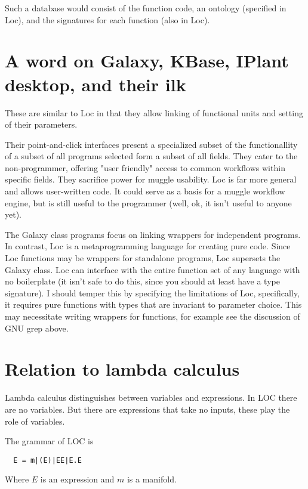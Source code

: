 \documentclass[12pt]{article}
\begin{document}
Such a database would consist of the function code, an ontology (specified in
Loc), and the signatures for each function (also in Loc).

\section{A word on Galaxy, KBase, IPlant desktop, and their ilk}

These are similar to Loc in that they allow linking of functional units and
setting of their parameters.

Their point-and-click interfaces present a specialized subset of the
functionallity of a subset of all programs selected form a subset of all
fields. They cater to the non-programmer, offering "user friendly" access to
common workflows within specific fields. They sacrifice power for muggle
usability. Loc is far more general and allows user-written code. It could serve
as a basis for a muggle workflow engine, but is still useful to the programmer
(well, ok, it isn't useful to anyone yet).

The Galaxy class programs focus on linking wrappers for independent programs.
In contrast, Loc is a metaprogramming language for creating pure code. Since
Loc functions may be wrappers for standalone programs, Loc supersets the Galaxy
class. Loc can interface with the entire function set of any language with no
boilerplate (it isn't safe to do this, since you should at least have a type
signature). I should temper this by specifying the limitations of Loc,
specifically, it requires pure functions with types that are invariant to
parameter choice. This may necessitate writing wrappers for functions, for
example see the discussion of GNU grep above.

\section{Relation to lambda calculus}

Lambda calculus distinguishes between variables and expressions. In LOC there
are no variables. But there are expressions that take no inputs, these play the
role of variables.

The grammar of LOC is

\begin{verbatim}
  E = m|(E)|EE|E.E
\end{verbatim}

Where $E$ is an expression and $m$ is a manifold.
\end{document}
